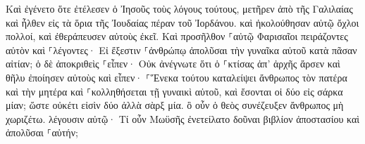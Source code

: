 \documentclass{openreader}
\begin{document}
Καὶ ἐγένετο ὅτε ἐτέλεσεν ὁ Ἰησοῦς τοὺς λόγους τούτους, μετῆρεν ἀπὸ τῆς Γαλιλαίας καὶ ἦλθεν εἰς τὰ ὅρια τῆς Ἰουδαίας πέραν τοῦ Ἰορδάνου. 
καὶ ἠκολούθησαν αὐτῷ ὄχλοι πολλοί, καὶ ἐθεράπευσεν αὐτοὺς ἐκεῖ. 
Καὶ προσῆλθον ⸀αὐτῷ Φαρισαῖοι πειράζοντες αὐτὸν καὶ ⸀λέγοντες· Εἰ ἔξεστιν ⸀ἀνθρώπῳ ἀπολῦσαι τὴν γυναῖκα αὐτοῦ κατὰ πᾶσαν αἰτίαν; 
ὁ δὲ ἀποκριθεὶς ⸀εἶπεν· Οὐκ ἀνέγνωτε ὅτι ὁ ⸀κτίσας ἀπ’ ἀρχῆς ἄρσεν καὶ θῆλυ ἐποίησεν αὐτοὺς 
καὶ εἶπεν· ⸀Ἕνεκα τούτου καταλείψει ἄνθρωπος τὸν πατέρα καὶ τὴν μητέρα καὶ ⸀κολληθήσεται τῇ γυναικὶ αὐτοῦ, καὶ ἔσονται οἱ δύο εἰς σάρκα μίαν; 
ὥστε οὐκέτι εἰσὶν δύο ἀλλὰ σὰρξ μία. ὃ οὖν ὁ θεὸς συνέζευξεν ἄνθρωπος μὴ χωριζέτω. 
λέγουσιν αὐτῷ· Τί οὖν Μωϋσῆς ἐνετείλατο δοῦναι βιβλίον ἀποστασίου καὶ ἀπολῦσαι ⸀αὐτήν; 
\end{document}
